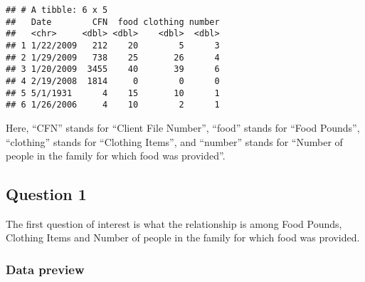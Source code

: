 \documentclass[]{article}
\newenvironment{Shaded}{\begin{snugshade}}{\end{snugshade}}
\newcommand{\DataTypeTok}[1]{\textcolor[rgb]{0.13,0.29,0.53}{#1}}
\newcommand{\KeywordTok}[1]{\textcolor[rgb]{0.13,0.29,0.53}{\textbf{#1}}}
\newcommand{\NormalTok}[1]{#1}
\newcommand{\OperatorTok}[1]{\textcolor[rgb]{0.81,0.36,0.00}{\textbf{#1}}}
\newcommand{\StringTok}[1]{\textcolor[rgb]{0.31,0.60,0.02}{#1}}
\begin{document}
\begin{Shaded}
\end{Shaded}

\begin{verbatim}
## # A tibble: 6 x 5
##   Date        CFN  food clothing number
##   <chr>     <dbl> <dbl>    <dbl>  <dbl>
## 1 1/22/2009   212    20        5      3
## 2 1/29/2009   738    25       26      4
## 3 1/20/2009  3455    40       39      6
## 4 2/19/2008  1814     0        0      0
## 5 5/1/1931      4    15       10      1
## 6 1/26/2006     4    10        2      1
\end{verbatim}

Here, ``CFN'' stands for ``Client File Number'', ``food'' stands for
``Food Pounds'', ``clothing'' stands for ``Clothing Items'', and
``number'' stands for ``Number of people in the family for which food
was provided''.

\hypertarget{question-1}{%
\subsection{Question 1}\label{question-1}}

The first question of interest is what the relationship is among Food
Pounds, Clothing Items and Number of people in the family for which food
was provided.

\hypertarget{data-preview}{%
\subsubsection{Data preview}\label{data-preview}}
\end{document}
